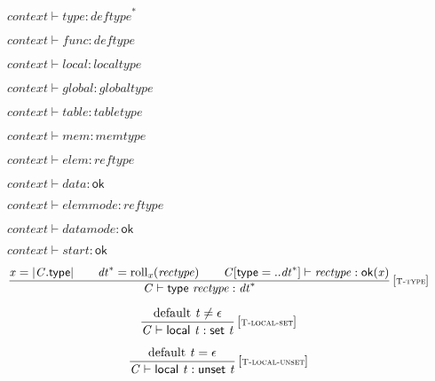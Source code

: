 \vspace{1ex}

$\boxed{{\mathit{context}} \vdash {\mathit{type}} : {{\mathit{deftype}}^\ast}}$

$\boxed{{\mathit{context}} \vdash {\mathit{func}} : {\mathit{deftype}}}$

$\boxed{{\mathit{context}} \vdash {\mathit{local}} : {\mathit{localtype}}}$

$\boxed{{\mathit{context}} \vdash {\mathit{global}} : {\mathit{globaltype}}}$

$\boxed{{\mathit{context}} \vdash {\mathit{table}} : {\mathit{tabletype}}}$

$\boxed{{\mathit{context}} \vdash {\mathit{mem}} : {\mathit{memtype}}}$

$\boxed{{\mathit{context}} \vdash {\mathit{elem}} : {\mathit{reftype}}}$

$\boxed{{\mathit{context}} \vdash {\mathit{data}} : \mathsf{ok}}$

$\boxed{{\mathit{context}} \vdash {\mathit{elemmode}} : {\mathit{reftype}}}$

$\boxed{{\mathit{context}} \vdash {\mathit{datamode}} : \mathsf{ok}}$

$\boxed{{\mathit{context}} \vdash {\mathit{start}} : \mathsf{ok}}$

$$
\begin{array}{@{}c@{}}\displaystyle
\frac{
{\mathit{x}} = {|{\mathit{C}}.\mathsf{type}|}
 \qquad
{{\mathit{dt}}^\ast} = {{\mathrm{roll}}}_{{\mathit{x}}}({\mathit{rectype}})
 \qquad
{\mathit{C}}{}[\mathsf{type} = ..{{\mathit{dt}}^\ast}] \vdash {\mathit{rectype}} : {\mathsf{ok}}{({\mathit{x}})}
}{
{\mathit{C}} \vdash \mathsf{type}~{\mathit{rectype}} : {{\mathit{dt}}^\ast}
} \, {[\textsc{\scriptsize T{-}type}]}
\qquad
\end{array}
$$

$$
\begin{array}{@{}c@{}}\displaystyle
\frac{
{\mathrm{default}}~{\mathit{t}} \neq \epsilon
}{
{\mathit{C}} \vdash \mathsf{local}~{\mathit{t}} : \mathsf{set}~{\mathit{t}}
} \, {[\textsc{\scriptsize T{-}local{-}set}]}
\qquad
\end{array}
$$

$$
\begin{array}{@{}c@{}}\displaystyle
\frac{
{\mathrm{default}}~{\mathit{t}} = \epsilon
}{
{\mathit{C}} \vdash \mathsf{local}~{\mathit{t}} : \mathsf{unset}~{\mathit{t}}
} \, {[\textsc{\scriptsize T{-}local{-}unset}]}
\qquad
\end{array}
$$

